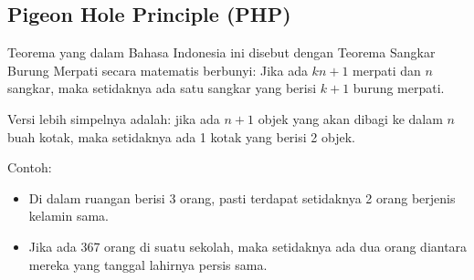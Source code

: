 \subsection{Pigeon Hole Principle (PHP)}
Teorema yang dalam Bahasa Indonesia ini disebut dengan Teorema Sangkar Burung Merpati secara matematis berbunyi:
Jika ada $kn+1$ merpati dan $n$ sangkar, maka setidaknya ada satu sangkar yang berisi $k+1$ burung merpati.

Versi lebih simpelnya adalah: jika ada $n+1$ objek yang akan dibagi ke dalam $n$ buah kotak, maka setidaknya ada 1 kotak yang berisi 2 objek.

Contoh: \begin{itemize}
    \item Di dalam ruangan berisi 3 orang, pasti terdapat setidaknya 2 orang berjenis kelamin sama.
    \item Jika ada 367 orang di suatu sekolah, maka setidaknya ada dua orang diantara mereka yang tanggal lahirnya persis sama.
\end{itemize}